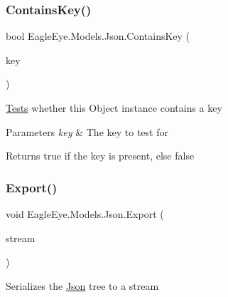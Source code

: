 \subsubsection{\texorpdfstring{ContainsKey()}{ContainsKey()}}
{\footnotesize\ttfamily bool Eagle\+Eye.\+Models.\+Json.\+Contains\+Key (\begin{DoxyParamCaption}\item[{string}]{key }\end{DoxyParamCaption})}



\mbox{\hyperlink{namespace_eagle_eye_1_1_tests}{Tests}} whether this Object instance contains a key 


\begin{DoxyParams}{Parameters}
{\em key} & The key to test for\\
\hline
\end{DoxyParams}
\begin{DoxyReturn}{Returns}
true if the key is present, else false
\end{DoxyReturn}
\mbox{\label{class_eagle_eye_1_1_models_1_1_json_ad911e1ca9e6ba8a8ae4c85152593c691}} 
\subsubsection{\texorpdfstring{Export()}{Export()}}
{\footnotesize\ttfamily void Eagle\+Eye.\+Models.\+Json.\+Export (\begin{DoxyParamCaption}\item[{Stream\+Writer}]{stream }\end{DoxyParamCaption})}



Serializes the \mbox{\hyperlink{class_eagle_eye_1_1_models_1_1_json}{Json}} tree to a stream 


